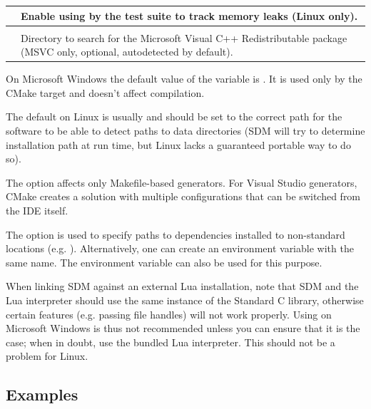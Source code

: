 \documentclass[a4paper,12pt,twoside,extrafontsizes]{memoir}
\begin{document}
\begin{table}[htbp]
\begin{tabularx}{\textwidth}{lL}
 & Enable using  by the test suite to track memory leaks (Linux only). \\

\midrule
{}\\
\midrule

 & Directory to search for the Microsoft Visual C++ Redistributable package (MSVC only, optional, autodetected by default).\\

\bottomrule
\end{tabularx}
\end{table}

On Microsoft Windows the default value of the  variable is . It is used only by the CMake  target and doesn't affect compilation.

The default  on Linux is usually  and should be set to the correct path for the software to be able to detect paths to data directories (SDM will try to determine installation path at run time, but Linux lacks a guaranteed portable way to do so).

The  option affects only Makefile-based generators. For Visual Studio generators, CMake creates a solution with multiple configurations that can be switched from the IDE itself.

The  option is used to specify paths to dependencies installed to non-standard locations (e.g. ). Alternatively, one can create an environment variable with the same name. The  environment variable can also be used for this purpose.

When linking SDM against an external Lua installation, note that SDM and the Lua interpreter should use the same instance of the Standard C library, otherwise certain features (e.g. passing file handles) will not work properly. Using  on Microsoft Windows is thus not recommended unless you can ensure that it is the case; when in doubt, use the bundled Lua interpreter. This should not be a problem for Linux.

\subsection{Examples}
\end{document}
